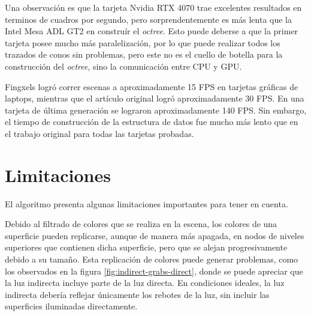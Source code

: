 Una observación es que la tarjeta Nvidia RTX 4070 trae excelentes resultados en terminos de cuadros por segundo, pero sorprendentemente es más lenta que la Intel Mesa ADL GT2 en construír el \textit{octree}.
Esto puede deberse a que la primer tarjeta posee mucho más paralelización, por lo que puede realizar todos los trazados de conos sin problemas, pero este no es el cuello de botella para la construcción del \textit{octree}, sino la comunicación entre CPU y GPU.

Fingxels logró correr escenas a aproximadamente 15 FPS en tarjetas gráficas de laptops, mientras que el artículo original logró aproximadamente 30 FPS.
En una tarjeta de última generación se lograron aproximadamente 140 FPS.
Sin embargo, el tiempo de construcción de la estructura de datos fue mucho más lento que en el trabajo original para todas las tarjetas probadas.

\section{Limitaciones}

El algoritmo presenta algunas limitaciones importantes para tener en cuenta.

Debido al filtrado de colores que se realiza en la escena, los colores de una superficie pueden replicarse, aunque de manera más apagada, en nodos de niveles superiores que contienen dicha superficie, pero que se alejan progresivamente debido a su tamaño.
Esta replicación de colores puede generar problemas, como los observados en la figura \ref{fig:indirect-grabs-direct}, donde se puede apreciar que la luz indirecta incluye parte de la luz directa.
En condiciones ideales, la luz indirecta debería reflejar únicamente los rebotes de la luz, sin incluir las superficies iluminadas directamente.

